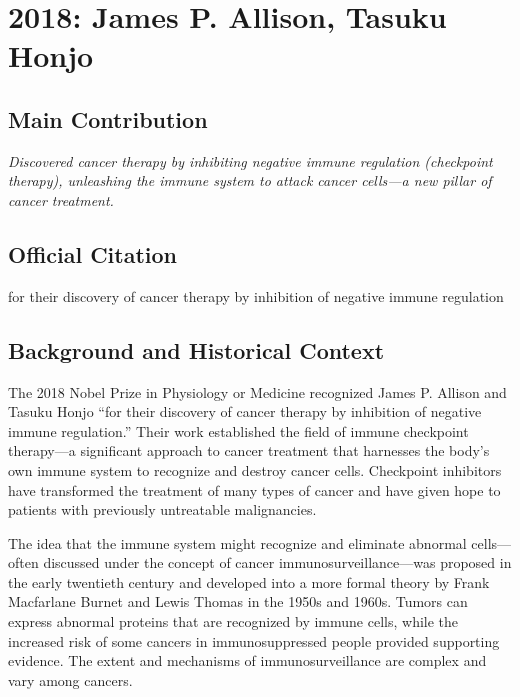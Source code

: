 \chapter[2018 --- Allison et al.]{2018: James P. Allison, Tasuku Honjo}
\label{ch:2018_Allison}

\section*{Main Contribution}

\textit{Discovered cancer therapy by inhibiting negative immune regulation (checkpoint therapy), unleashing the immune system to attack cancer cells---a new pillar of cancer treatment.}\cite{nobel-2018,lecture-2018}

\section{Official Citation}

for their discovery of cancer therapy by inhibition of negative immune regulation

\section{Background and Historical Context}

The 2018 Nobel Prize in Physiology or Medicine recognized James P. Allison and Tasuku Honjo ``for their discovery of cancer therapy by inhibition of negative immune regulation.'' Their work established the field of immune checkpoint therapy---a significant approach to cancer treatment that harnesses the body's own immune system to recognize and destroy cancer cells. Checkpoint inhibitors have transformed the treatment of many types of cancer and have given hope to patients with previously untreatable malignancies.

The idea that the immune system might recognize and eliminate abnormal cells---often discussed under the concept of cancer immunosurveillance---was proposed in the early twentieth century and developed into a more formal theory by Frank Macfarlane Burnet and Lewis Thomas in the 1950s and 1960s. Tumors can express abnormal proteins that are recognized by immune cells, while the increased risk of some cancers in immunosuppressed people provided supporting evidence. The extent and mechanisms of immunosurveillance are complex and vary among cancers.

